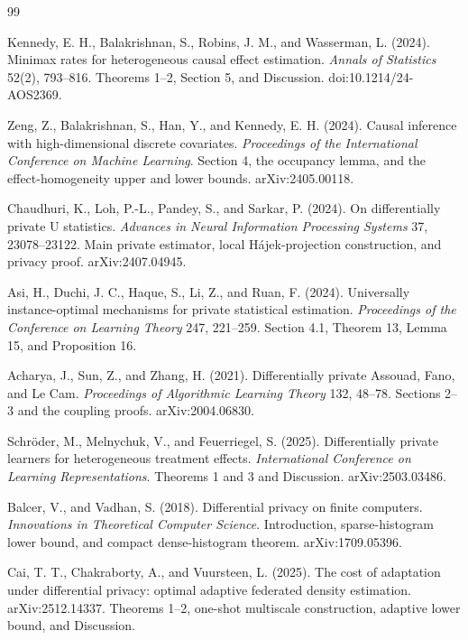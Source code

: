 \documentclass{article}
\begin{document}
\begin{thebibliography}{99}

   Kennedy, E. H., Balakrishnan, S., Robins, J. M., and Wasserman, L. (2024). Minimax rates for heterogeneous causal effect estimation. \emph{Annals of Statistics} 52(2), 793--816. Theorems 1--2, Section 5, and Discussion. doi:10.1214/24-AOS2369.

   Zeng, Z., Balakrishnan, S., Han, Y., and Kennedy, E. H. (2024). Causal inference with high-dimensional discrete covariates. \emph{Proceedings of the International Conference on Machine Learning}. Section 4, the occupancy lemma, and the effect-homogeneity upper and lower bounds. arXiv:2405.00118.

   Chaudhuri, K., Loh, P.-L., Pandey, S., and Sarkar, P. (2024). On differentially private U statistics. \emph{Advances in Neural Information Processing Systems} 37, 23078--23122. Main private estimator, local Hájek-projection construction, and privacy proof. arXiv:2407.04945.

   Asi, H., Duchi, J. C., Haque, S., Li, Z., and Ruan, F. (2024). Universally instance-optimal mechanisms for private statistical estimation. \emph{Proceedings of the Conference on Learning Theory} 247, 221--259. Section 4.1, Theorem 13, Lemma 15, and Proposition 16.

   Acharya, J., Sun, Z., and Zhang, H. (2021). Differentially private Assouad, Fano, and Le Cam. \emph{Proceedings of Algorithmic Learning Theory} 132, 48--78. Sections 2--3 and the coupling proofs. arXiv:2004.06830.

   Schröder, M., Melnychuk, V., and Feuerriegel, S. (2025). Differentially private learners for heterogeneous treatment effects. \emph{International Conference on Learning Representations}. Theorems 1 and 3 and Discussion. arXiv:2503.03486.

   Balcer, V., and Vadhan, S. (2018). Differential privacy on finite computers. \emph{Innovations in Theoretical Computer Science}. Introduction, sparse-histogram lower bound, and compact dense-histogram theorem. arXiv:1709.05396.

   Cai, T. T., Chakraborty, A., and Vuursteen, L. (2025). The cost of adaptation under differential privacy: optimal adaptive federated density estimation. arXiv:2512.14337. Theorems 1--2, one-shot multiscale construction, adaptive lower bound, and Discussion.


\end{thebibliography}
\end{document}

